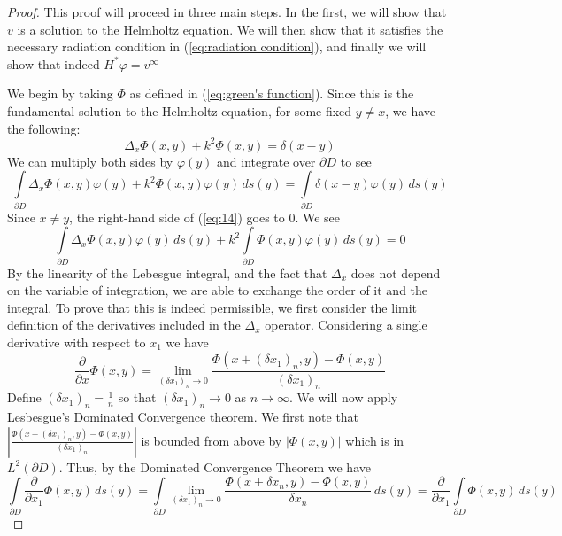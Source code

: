\documentclass[]{article}
\begin{document}
				\begin{proof}
					This proof will proceed in three main steps. In the first, we will show that $v$ is a solution to the Helmholtz equation. We will then show that it satisfies the necessary radiation condition in (\ref{eq:radiation condition}), and finally we will show that indeed $H^\ast \varphi = v^\infty$
					
					We begin by taking $\Phi$ as defined in (\ref{eq:green's function}). Since this is the fundamental solution to the Helmholtz equation, for some fixed $y\neq x$, we have the following:
					\begin{equation}
						\Delta_x \Phi(x, y) + k^2 \Phi(x, y) = \delta(x-y)
					\end{equation}
					We can multiply both sides by $\varphi(y)$ and integrate over $\partial D$ to see
					\begin{equation} \label{eq:14}
						\int\limits_{\partial D}\Delta_x \Phi(x, y)\varphi(y) + k^2 \Phi(x, y)\varphi(y)\, ds(y) = \int\limits_{\partial D}\delta(x-y)\varphi(y)\, ds(y)
					\end{equation}
					Since $x\neq y$, the right-hand side of (\ref{eq:14}) goes to 0. We see
					\begin{equation}
						\int\limits_{\partial D}\Delta_x \Phi(x, y)\varphi(y)\, ds(y) + k^2\int\limits_{\partial D}\Phi(x, y)\varphi(y)\, ds(y) = 0
					\end{equation}
					By the linearity of the Lebesgue integral, and the fact that $\Delta_x$ does not depend on the variable of integration, we are able to exchange the order of it and the integral. To prove that this is indeed permissible, we first consider the limit definition of the derivatives included in the $\Delta_x$ operator. Considering a single derivative with respect to $x_1$ we have
					\begin{equation}
						\frac{\partial }{\partial x}\Phi(x, y) = \lim_{(\delta x_1)_n \to 0}\frac{\Phi(x+ (\delta x_1)_n, y) - \Phi(x, y)}{(\delta x_1)_n}
					\end{equation}
					Define $(\delta x_1)_n = \frac{1}{n}$ so that $(\delta x_1)_n\to 0 $ as $n \to \infty$. We will now apply Lesbesgue's Dominated Convergence theorem. We first note that $ \left|\frac{\Phi(x+ (\delta x_1)_n, y) - \Phi(x, y)}{(\delta x_1)_n}\right|$ is bounded from above by $|\Phi(x, y)|$ which is in $L^2(\partial D)$. Thus, by the Dominated Convergence Theorem we have
					\begin{equation}
						\int\limits_{\partial D}\frac{\partial }{\partial x_1}\Phi(x, y)\, ds(y) = \int\limits_{\partial D}\lim_{(\delta x_1)_n \to 0}\frac{\Phi(x+ \delta x_n, y) - \Phi(x, y)}{\delta x_n}\, ds(y) =  \frac{\partial }{\partial x_1}\int\limits_{\partial D}\Phi(x, y)\, ds(y)

\end{equation}
\end{proof}
\end{document}
